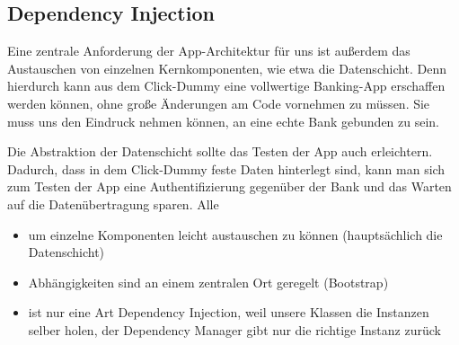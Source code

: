 \subsection{Dependency Injection}
	Eine zentrale Anforderung der App-Architektur für uns ist außerdem das Austauschen von einzelnen Kernkomponenten, wie etwa die Datenschicht. Denn hierdurch kann aus dem Click-Dummy eine vollwertige Banking-App erschaffen werden können, ohne große Änderungen am Code vornehmen zu müssen.  Sie muss uns den Eindruck nehmen können, an eine echte Bank gebunden zu sein.
	
	Die Abstraktion der Datenschicht sollte das Testen der App auch erleichtern. Dadurch, dass in dem Click-Dummy feste Daten hinterlegt sind, kann man sich zum Testen der App eine Authentifizierung gegenüber der Bank und das Warten auf die Datenübertragung sparen. Alle 
	
\begin{itemize}
	\item um einzelne Komponenten leicht austauschen zu können (hauptsächlich die Datenschicht)
	\item Abhängigkeiten sind an einem zentralen Ort geregelt (Bootstrap)
	\item ist nur eine Art Dependency Injection, weil unsere Klassen die Instanzen selber holen, der Dependency Manager gibt nur die richtige Instanz zurück
\end{itemize}